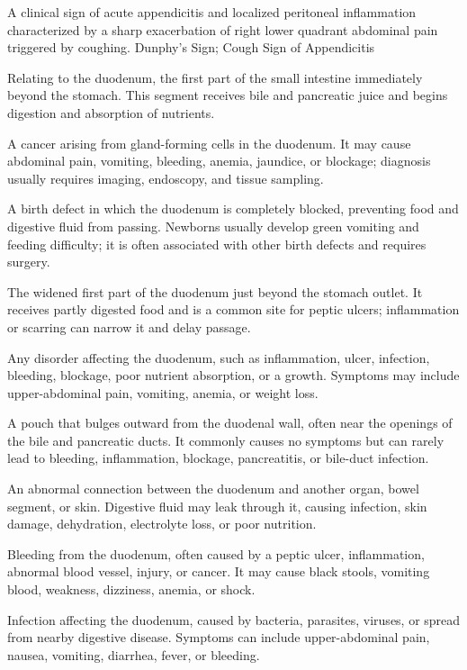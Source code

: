  A clinical sign of acute appendicitis and localized peritoneal inflammation characterized by a sharp exacerbation of right lower quadrant abdominal pain triggered by coughing.
\synonyms
Dunphy's Sign; Cough Sign of Appendicitis

 Relating to the duodenum, the first part of the small intestine immediately beyond the stomach. This segment receives bile and pancreatic juice and begins digestion and absorption of nutrients.

 A cancer arising from gland-forming cells in the duodenum. It may cause abdominal pain, vomiting, bleeding, anemia, jaundice, or blockage; diagnosis usually requires imaging, endoscopy, and tissue sampling.

 A birth defect in which the duodenum is completely blocked, preventing food and digestive fluid from passing. Newborns usually develop green vomiting and feeding difficulty; it is often associated with other birth defects and requires surgery.

 The widened first part of the duodenum just beyond the stomach outlet. It receives partly digested food and is a common site for peptic ulcers; inflammation or scarring can narrow it and delay passage.

 Any disorder affecting the duodenum, such as inflammation, ulcer, infection, bleeding, blockage, poor nutrient absorption, or a growth. Symptoms may include upper-abdominal pain, vomiting, anemia, or weight loss.

 A pouch that bulges outward from the duodenal wall, often near the openings of the bile and pancreatic ducts. It commonly causes no symptoms but can rarely lead to bleeding, inflammation, blockage, pancreatitis, or bile-duct infection.

 An abnormal connection between the duodenum and another organ, bowel segment, or skin. Digestive fluid may leak through it, causing infection, skin damage, dehydration, electrolyte loss, or poor nutrition.

 Bleeding from the duodenum, often caused by a peptic ulcer, inflammation, abnormal blood vessel, injury, or cancer. It may cause black stools, vomiting blood, weakness, dizziness, anemia, or shock.

 Infection affecting the duodenum, caused by bacteria, parasites, viruses, or spread from nearby digestive disease. Symptoms can include upper-abdominal pain, nausea, vomiting, diarrhea, fever, or bleeding.

